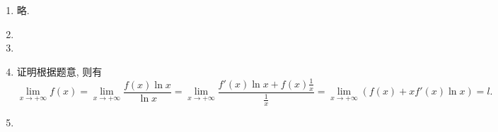 \documentclass[a4paper, 10pt]{ctexart}
\begin{document}
\pagestyle{empty}
\begin{enumerate}
    \item %
        略.
    \item %
    \item %
    \item %
        {\heiti 证明}\quad 根据题意, 则有
        \[
            \lim_{x\to+\infty}f(x) = \lim_{x\to+\infty}\frac{f(x)\ln x}{\ln x} = \lim_{x\to+\infty}\frac{f'(x)\ln x + f(x)\frac1x}{\frac1x} = \lim_{x\to+\infty}(f(x) + xf'(x)\ln x) = l.    
        \]
    \item %
\end{enumerate}
\end{document}
